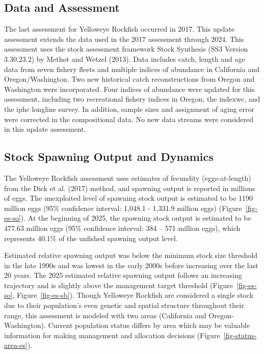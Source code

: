 \documentclass[
]{scrartcl}
\begin{document}
\clearpage

\subsection*{Data and Assessment}\label{data-and-assessment}

The last assessment for Yelloweye Rockfish occurred in 2017. This update
assessment extends the data used in the 2017 assessment through 2024.
This assessment uses the stock assessment framework Stock Synthesis (SS3
Version 3.30.23.2) by Methot and Wetzel (2013). Data includes catch,
length and age data from seven fishery fleets and multiple indices of
abundance in California and Oregon/Washington. Two new historical catch
reconstructions from Oregon and Washington were incorporated. Four
indices of abundance were updated for this assessment, including two
recreational fishery indices in Oregon, the \gls{indexwc}, and the
\gls{iphc} longline survey. In addition, sample sizes and assignment of
aging error were corrected in the compositional data. No new data
streams were considered in this update assessment.

\subsection*{Stock Spawning Output and
Dynamics}\label{stock-spawning-output-and-dynamics}

The Yelloweye Rockfish assessment uses estimates of fecundity
(eggs-at-length) from the Dick et al. (2017) method, and spawning output
is reported in millions of eggs. The unexploited level of spawning stock
output is estimated to be 1190 million eggs (95\% confidence interval:
1,048.1 - 1,331.9 million eggs) (Figure~\ref{fig-es-so}). At the
beginning of 2025, the spawning stock output is estimated to be 477.63
million eggs (95\% confidence interval: 384 -- 571 million eggs), which
represents 40.1\% of the unfished spawning output level.

Estimated relative spawning output was below the minimum stock size
threshold in the late 1990s and was lowest in the early 2000s before
increasing over the last 20 years. The 2025 estimated relative spawning
output follows an increasing trajectory and is slightly above the
management target threshold (Figure~\ref{fig-es-so},
Figure~\ref{fig-es-sb}). Though Yelloweye Rockfish are considered a
single stock due to their population's even genetic and spatial
structure throughout their range, this assessment is modeled with two
areas (California and Oregon-Washington). Current population status
differs by area which may be valuable information for making management
and allocation decisions (Figure~\ref{fig-status-area-es}).
\end{document}
